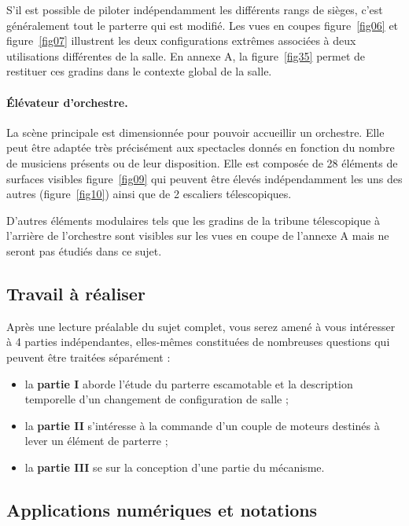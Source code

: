 \newpage

S'il est possible de piloter indépendamment les différents rangs de sièges, c'est généralement tout le parterre qui est modifié. Les vues en coupes figure~\ref{fig06} et figure~\ref{fig07} illustrent les deux configurations extrêmes associées à deux utilisations différentes de la salle. En annexe A, la figure~\ref{fig35} permet de restituer ces gradins dans le contexte global de la salle.

\paragraph{Élévateur d'orchestre.} La scène principale est dimensionnée pour pouvoir accueillir un orchestre. Elle peut être adaptée très précisément aux spectacles donnés en fonction du nombre de musiciens présents ou de leur disposition. Elle est composée de 28 éléments de surfaces visibles figure~\ref{fig09} qui peuvent être élevés indépendamment les uns des autres (figure~\ref{fig10}) ainsi que de 2 escaliers télescopiques.


D'autres éléments modulaires tels que les gradins de la tribune télescopique à l'arrière de l'orchestre sont visibles sur les vues en coupe de l'annexe A mais ne seront pas étudiés dans ce sujet.

\subsection*{Travail à réaliser}

Après une lecture préalable du sujet complet, vous serez amené à vous intéresser à 4 parties indépendantes, elles-mêmes constituées de nombreuses questions qui peuvent être traitées séparément :
\begin{itemize}
\item la \textbf{partie I} aborde l'étude du parterre escamotable et la description temporelle d'un changement de configuration de salle ;
\item la \textbf{partie II} s'intéresse à la commande d'un couple de moteurs destinés à lever un élément de parterre ;
\item la \textbf{partie III} se sur la conception d'une partie du mécanisme.
\end{itemize}

\subsection*{Applications numériques et notations}


